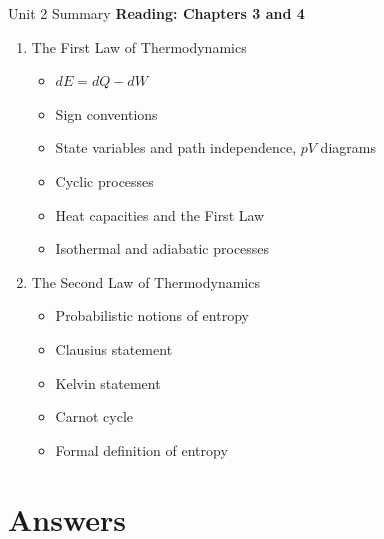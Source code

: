 \documentclass{beamer}
\begin{document}
\begin{frame}{Unit 2 Summary}
\textbf{Reading: Chapters 3 and 4}
\begin{enumerate}
\item The First Law of Thermodynamics
\begin{itemize}
\item $dE = dQ - dW$
\item Sign conventions
\item State variables and path independence, $pV$ diagrams
\item Cyclic processes
\item Heat capacities and the First Law
\item Isothermal and adiabatic processes
\end{itemize}
\item The Second Law of Thermodynamics
\begin{itemize}
\item Probabilistic notions of entropy
\item Clausius statement
\item Kelvin statement
\item Carnot cycle
\item Formal definition of entropy
\end{itemize}
\end{enumerate}
\end{frame}

\section{Answers}
\end{document}
